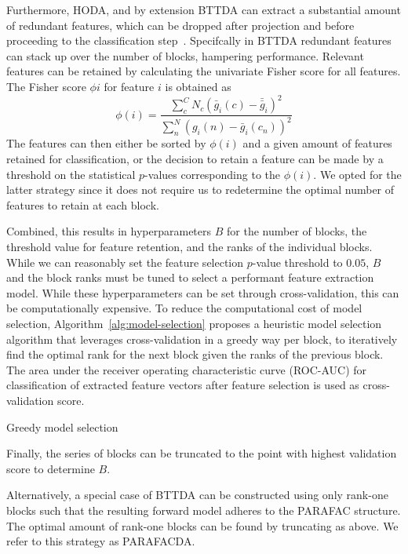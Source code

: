 Furthermore, HODA, and by extension BTTDA can extract a substantial amount
of redundant features, which can be dropped after projection and before proceeding to the classification
step~\cite{Phan2010}.
Specifcally in BTTDA redundant features can stack up over the number of
blocks, hampering performance.
Relevant features can be retained by calculating the
univariate Fisher score for all features.
The Fisher score $\phi{i}$ for feature $i$ is obtained as
\begin{equation}
	\phi(i) = \frac
	{\sum_c^C N_c \left(\bar{g}_i(c)-\bar{\bar{g}}_i\right)^2}
	{\sum_n^N \left(g_i(n)-\bar{g}_i(c_n)\right)^2}
\end{equation}
The features can then either be sorted by $\phi(i)$ and a given amount of
features retained for classification, or the decision to retain a feature can
be made by a threshold on the statistical $p$-values corresponding to the
$\phi(i)$.
We opted for the latter strategy since it does not require us to redetermine the
optimal number of features to retain at each block.

Combined, this results in hyperparameters $B$ for the number of blocks, the
threshold value for feature retention, and the ranks of the individual blocks.
While we can reasonably set the feature selection $p$-value threshold to $0.05$,
$B$ and the block ranks must be tuned to select a performant feature extraction
model.
While these hyperparameters can be set through cross-validation, this can be
computationally expensive.
To reduce the computational cost of model selection,
Algorithm~\ref{alg:model-selection} proposes a heuristic model selection
algorithm that leverages cross-validation in a greedy way per block, to
iteratively find the optimal rank for the next block given the ranks of the
previous block.
The area under the receiver operating characteristic curve (ROC-AUC) for
classification of extracted feature vectors after feature selection is used as
cross-validation score.
\begin{algorithm}
  \caption[The greedy model selection procedure.]{Greedy model selection}
	\label{alg:model-selection}
	
\end{algorithm}
Finally, the series of blocks can be truncated to the point with
highest validation score to determine $B$.

Alternatively, a special case of BTTDA can be constructed using only rank-one
blocks such that the resulting forward model adheres to the PARAFAC structure.
The optimal amount of rank-one blocks can be found by truncating as above.
We refer to this strategy as PARAFACDA.

